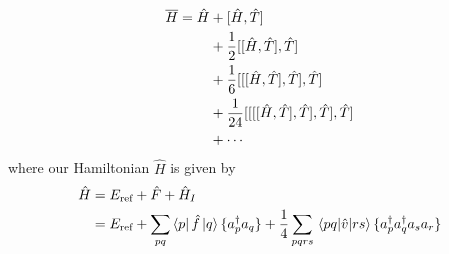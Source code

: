 \documentclass[a4paper,12pt]{article}
\newcommand{\hatH}{\hat{H}}
\newcommand{\brak}[2]{\mel{#1}{\hat{v}}{#2}}
\begin{document}
\begin{align}
    \label{eq:BCH}
    \overline{H} = \hat{H} &+ [\hat{H},\hat{T}]\notag \\
                        &+ \frac{1}{2}[[\hat{H},\hat{T}],\hat{T}]\notag \\
                        &+ \frac{1}{6}[[[\hat{H},\hat{T}],\hat{T}],\hat{T}] \\
                        &+ \frac{1}{24}[[[[\hat{H},\hat{T}],\hat{T}],\hat{T}],\hat{T}] \notag \\
                        &+ \cdots \notag
\end{align}
where our Hamiltonian $\hat{H}$ is given by 
\begin{align}
    \label{eq:hamiltonian}
    \hatH &=E_{\text{ref}}+\hat{F} + \hat{H}_I \notag \\
         &= E_{\text{ref}} + \sum_{pq}\bra{p}\hat{f} \ket{q} \{a^\dagger_p a_q \} + \frac{1}{4}\sum_{pqrs} \brak{pq}{rs} \{a^\dagger_p a^\dagger_q a_s a_r \}
\end{align}
\end{document}
